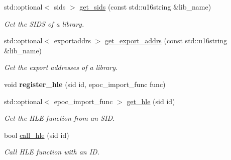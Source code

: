 \begin{DoxyCompactItemize}
\mbox{\label{classeka2l1_1_1hle_1_1lib__manager_ae1ea4a98a8fe3ca5480644166ed11dd7}} 
std\+::optional$<$ sids $>$ \mbox{\hyperlink{classeka2l1_1_1hle_1_1lib__manager_ae1ea4a98a8fe3ca5480644166ed11dd7}{get\+\_\+sids}} (const std\+::u16string \&lib\+\_\+name)
\begin{DoxyCompactList}\small\item\em Get the S\+I\+DS of a library. \end{DoxyCompactList}\item 
\mbox{\label{classeka2l1_1_1hle_1_1lib__manager_a85527f2a656da201098c50a9c2007aa3}} 
std\+::optional$<$ exportaddrs $>$ \mbox{\hyperlink{classeka2l1_1_1hle_1_1lib__manager_a85527f2a656da201098c50a9c2007aa3}{get\+\_\+export\+\_\+addrs}} (const std\+::u16string \&lib\+\_\+name)
\begin{DoxyCompactList}\small\item\em Get the export addresses of a library. \end{DoxyCompactList}\item 
\mbox{\label{classeka2l1_1_1hle_1_1lib__manager_a72153f2e0e0c2ca2eda175d430236bbf}} 
void {\bfseries register\+\_\+hle} (sid id, epoc\+\_\+import\+\_\+func func)
\item 
\mbox{\label{classeka2l1_1_1hle_1_1lib__manager_a8e8c17aad04df862c42ef9c02346cf6a}} 
std\+::optional$<$ epoc\+\_\+import\+\_\+func $>$ \mbox{\hyperlink{classeka2l1_1_1hle_1_1lib__manager_a8e8c17aad04df862c42ef9c02346cf6a}{get\+\_\+hle}} (sid id)
\begin{DoxyCompactList}\small\item\em Get the H\+LE function from an S\+ID. \end{DoxyCompactList}\item 
\mbox{\label{classeka2l1_1_1hle_1_1lib__manager_a0962316ebc13ec419adbfdd66a4f6db9}} 
bool \mbox{\hyperlink{classeka2l1_1_1hle_1_1lib__manager_a0962316ebc13ec419adbfdd66a4f6db9}{call\+\_\+hle}} (sid id)
\begin{DoxyCompactList}\small\item\em Call H\+LE function with an ID. \end{DoxyCompactList}\item 

\end{DoxyCompactItemize}
